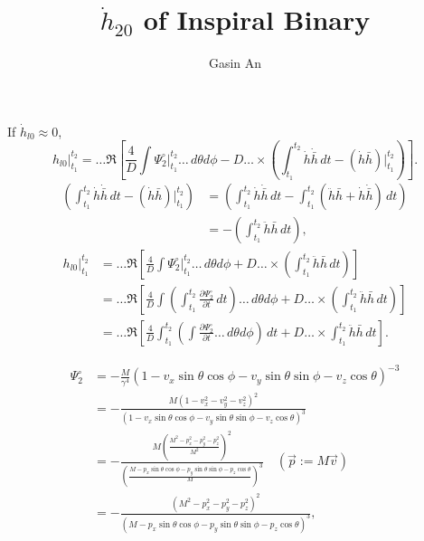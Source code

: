 \documentclass{ctexbeamer}
\title{$\dot{h}_{20}$ of Inspiral Binary}
\author{Gasin An}
\date{}
\begin{document}
    \begin{frame}
        \titlepage
    \end{frame}
    \begin{frame}
        If $\dot{h}_{l0}\approx0$,
        \small
        \begin{equation}
            h_{l0}\vert_{t_1}^{t_2}=\dots\Re\left[
            \frac{4}{D}\int\Psi_2^\circ\vert_{t_1}^{t_2}\dots\,d\theta d\phi
            -D\dots\times\left(
            \int_{t_1}^{t_2}\dot{h}\dot{\bar{h}}\,dt
            -(\dot{h}\bar{h})\vert_{t_1}^{t_2}
            \right)
            \right].
        \end{equation}
        \begin{align}
            \left(
            \int_{t_1}^{t_2}\dot{h}\dot{\bar{h}}\,dt
            -(\dot{h}\bar{h})\vert_{t_1}^{t_2}
            \right)
            &=\left(
            \int_{t_1}^{t_2}\dot{h}\dot{\bar{h}}\,dt
            -\int_{t_1}^{t_2}(\ddot{h}\bar{h}+\dot{h}\dot{\bar{h}})\,dt
            \right)\\
            &=-\left(
            \int_{t_1}^{t_2}\ddot{h}\bar{h}\,dt
            \right),
        \end{align}
        \begin{align}
            h_{l0}\vert_{t_1}^{t_2}&=\dots\Re\left[
            \frac{4}{D}\int\Psi_2^\circ\vert_{t_1}^{t_2}\dots\,d\theta d\phi
            +D\dots\times\left(
            \int_{t_1}^{t_2}\ddot{h}\bar{h}\,dt
            \right)
            \right]\\
            &=\dots\Re\left[
            \frac{4}{D}\int\left(\int_{t_1}^{t_2}\frac{\partial\Psi_2^\circ}{\partial t}\,dt\right)\dots\,d\theta d\phi
            +D\dots\times\left(
            \int_{t_1}^{t_2}\ddot{h}\bar{h}\,dt
            \right)
            \right]\\
            &=\dots\Re\left[
            \frac{4}{D}\int_{t_1}^{t_2}\left(\int\frac{\partial\Psi_2^\circ}{\partial t}\dots\,d\theta d\phi\right)\,dt
            +D\dots\times\int_{t_1}^{t_2}\ddot{h}\bar{h}\,dt
            \right].
        \end{align}
    \end{frame}
    \begin{frame}
        \begin{align}
            \Psi_2^\circ&=-\frac{M}{\gamma^4}(1-v_x\sin\theta\cos\phi-v_y\sin\theta\sin\phi-v_z\cos\theta)^{-3}\\
            &=-\frac{M(1-v_x^2-v_y^2-v_z^2)^2}{(1-v_x\sin\theta\cos\phi-v_y\sin\theta\sin\phi-v_z\cos\theta)^3}\\
            &=-\frac{M(\frac{M^2-p_x^2-p_y^2-p_z^2}{M^2})^2}
            {(\frac{M-p_x\sin\theta\cos\phi-p_y\sin\theta\sin\phi-p_z\cos\theta}{M})^3}\quad(\vec{p}:=M\vec{v})\\
            &=-\frac{(M^2-p_x^2-p_y^2-p_z^2)^2}
            {(M-p_x\sin\theta\cos\phi-p_y\sin\theta\sin\phi-p_z\cos\theta)^3},
        \end{align}
    \end{frame}
\end{document}
